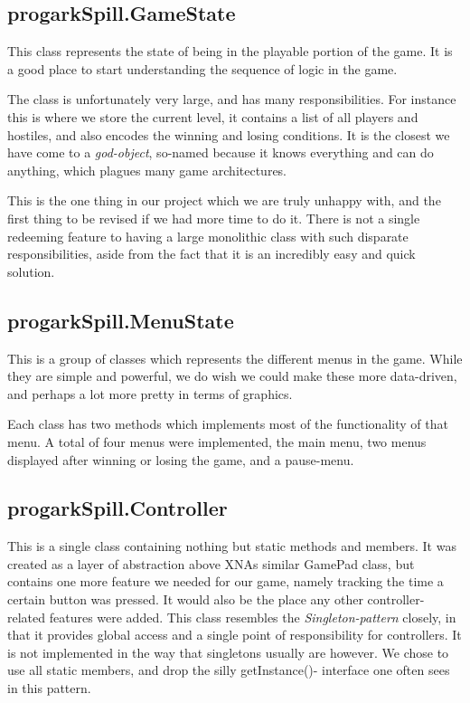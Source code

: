 \subsection{progarkSpill.GameState}
This class represents the state of being in the playable portion of the game. 
It is a good place to start understanding the sequence of logic in the game.

The class is unfortunately very large, and has many responsibilities. For 
instance this is where we store the current level, it contains a list of all
players and hostiles, and also encodes the winning and losing conditions. It is
the closest we have come to a \emph{god-object}, so-named because it knows
everything and can do anything, which plagues many game architectures.

This is the one thing in our project which we are truly unhappy with, and the
first thing to be revised if we had more time to do it. There is not a single
redeeming feature to having a large monolithic class with such disparate
responsibilities, aside from the fact that it is an incredibly easy and quick
solution.

\subsection{progarkSpill.MenuState}
This is a group of classes which represents the different menus in the game.
While they are simple and powerful, we do wish we could make these more
data-driven, and perhaps a lot more pretty in terms of graphics.

Each class has two methods which implements most of the functionality of that
menu. A total of four menus were implemented, the main menu, two menus 
displayed  after winning or losing the game, and a pause-menu.

\subsection{progarkSpill.Controller}
This is a single class containing nothing but static methods and members. It
was created as a layer of abstraction above XNAs similar GamePad class, but
contains one more feature we needed for our game, namely tracking the time a
certain button was pressed. It would also be the place any other controller-
related features were added. This class resembles the \emph{Singleton-pattern}
closely, in that it provides global access and a single point of responsibility
for controllers. It is not implemented in the way that singletons usually are
however. We chose to use all static members, and drop the silly getInstance()-
interface one often sees in this pattern.

